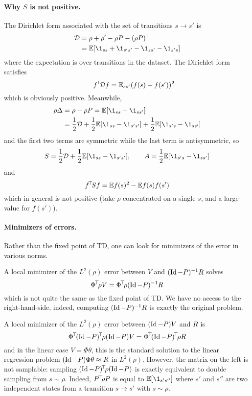 \documentclass[11pt,a4paper]{article}
\newcommand{\Dir}{\mathcal{D}}
\begin{document}
\paragraph{Why $S$ is not positive.} The Dirichlet form associated
with the set of transitions $s\to s'$ is
\begin{align}
\Dir&=\rho+\rho'-\rho P-\transp{(\rho P)}
\\&=\E[\1_{ss}+\1_{s's'}-\1_{ss'}-\1_{s's}]
\end{align}
where the expectation is over transitions in the dataset. The Dirichlet
form satisfies
\begin{equation}
\qquad \transp{f}\Dir f=\E_{ss'}(f(s)-f(s'))^2
\end{equation}
which is obviously positive. Meanwhile,
\begin{align}
\rho\Delta&=\rho-\rho P=\E[\1_{ss}-\1_{ss'}]
\\&=\frac12 \Dir+\frac12 \E[\1_{ss}-\1_{s's'}]+\frac12
\E[\1_{s's}-\1_{ss'}]
\end{align}
and the first two terms are symmetric while the last term is
antisymmetric, so
\begin{equation}
S=\frac12 \Dir+\frac12 \E[\1_{ss}-\1_{s's'}],\qquad A=\frac12
\E[\1_{s's}-\1_{ss'}]
\end{equation}
and
\begin{equation}
f^{\!\top}\!Sf=\mathbb{E} f(s)^2-\mathbb{E} f(s)f(s')
\end{equation}
which in general is not positive (take $\rho$ concentrated on a single $s$, and a large value
for $f(s')$).

\paragraph{Minimizers of errors.} Rather than the fixed point of TD, one
can look for minimizers of the error in various norms.

A local minimizer of the $L^2(\rho)$ error between $V$ and
$(\operatorname{Id}-P)^{-1}R$ solves
\begin{equation}
\Phi^{\!\top}\! \rho V=\Phi^{\!\top}\!\rho (\operatorname{Id}-P)^{-1} R
\end{equation}
which is not quite the same as the fixed point of TD. We have no access
to the right-hand-side, indeed, computing $(\operatorname{Id}-P)^{-1} R$ is exactly the
original problem.

A local minimizer of the
$L^2(\rho)$ error between $(\operatorname{Id}-P)V$ and $R$ is
\begin{equation}
\transp{\Phi}\transp{(\Id-P)}\rho(\Id-P)V=\transp{\Phi}\transp{(\Id-P)}\rho R
\end{equation}
and in the linear case $V=\Phi\theta$, this is the standard solution to
the linear regression problem $(\operatorname{Id}-P)\Phi\theta\approx R$ in
$L^2(\rho)$. However, the matrix on the left is not samplable: sampling
$(\operatorname{Id}-P)^{\!\top}\!\rho(\operatorname{Id}-P)$ is exactly equivalent to double sampling
from $s\sim \rho$.
Indeed, $P^{\!\top}\!\rho P$ is equal to $\E[\1_{s' s''}]$ where $s'$ and
$s''$ are two independent states from a transition $s\to s'$ with $s\sim
\rho$.
\end{document}
